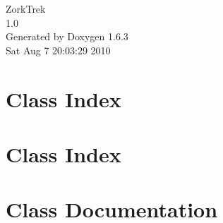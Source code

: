 \documentclass[a4paper]{book}
\begin{document}
\hypersetup{pageanchor=false}
\begin{titlepage}
\vspace*{7cm}
\begin{center}
{\Large ZorkTrek \\[1ex]\large 1.0 }\\
\vspace*{1cm}
{\large Generated by Doxygen 1.6.3}\\
\vspace*{0.5cm}
{\small Sat Aug 7 20:03:29 2010}\\
\end{center}
\end{titlepage}
\clearemptydoublepage
{}
\tableofcontents
\clearemptydoublepage
{}
\hypersetup{pageanchor=true}
\chapter{Class Index}

\chapter{Class Index}

\chapter{Class Documentation}






















\printindex
\end{document}
